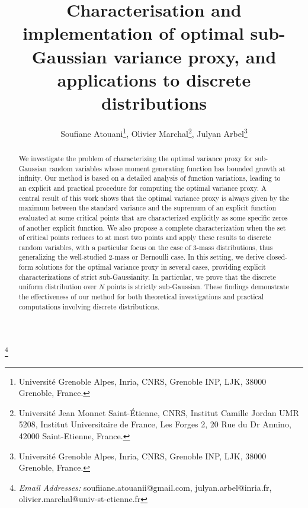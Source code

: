 \documentclass[a4paper, 10pt]{article}
\author{
Soufiane Atouani\footnote{Universit\'{e} Grenoble Alpes, Inria, CNRS, Grenoble INP, LJK, 38000 Grenoble, France.},
Olivier Marchal\footnote{Universit\'{e} Jean Monnet Saint-\'{E}tienne, CNRS, Institut Camille Jordan UMR 5208, Institut Universitaire de France, Les Forges 2, 20 Rue du Dr Annino, 42000 Saint-Etienne, France.}, 
Julyan Arbel\footnote{Universit\'{e} Grenoble Alpes, Inria, CNRS, Grenoble INP, LJK, 38000 Grenoble, France.}
}
\title{Characterisation and implementation of optimal sub-Gaussian variance proxy, and applications to discrete distributions}
\date{}
\renewcommand{\thefootnote}{\fnsymbol{footnote}}
\theoremstyle{definition}
\newcommand\blfootnote[1]{%
  \begingroup
  \renewcommand\thefootnote{}\footnote{#1}%
  \addtocounter{footnote}{-1}%
  \endgroup
}
\begin{document}
\maketitle

\blfootnote{\textit{Email Addresses:}
\textsf{soufiiane.atouanii@gmail.com},
\textsf{julyan.arbel@inria.fr},
\textsf{olivier.marchal@univ-st-etienne.fr}}

\begin{abstract}
We investigate the problem of characterizing the optimal variance proxy for sub-Gaussian random variables whose moment generating function has bounded growth at infinity. Our method is based on a detailed analysis of function variations, leading  to an explicit and practical procedure for computing the optimal variance proxy. A central result of this work shows that the optimal variance proxy is always given by the maximum between the standard variance and the supremum of an explicit function evaluated at some critical points that are characterized explicitly as some specific zeros of another explicit function. We also propose a complete characterization when the set of critical points reduces to at most two points and apply these results to discrete random variables, with a particular focus on the case of 3-mass distributions, thus generalizing the well-studied 2-mass or Bernoulli case. In this setting, we derive closed-form solutions for the optimal variance proxy in several cases, providing explicit characterizations of strict sub-Gaussianity. In particular, we prove that the discrete uniform distribution over $N$ points is strictly sub-Gaussian. These findings demonstrate the effectiveness of our method for both theoretical investigations and practical computations involving discrete distributions.
\end{abstract}


\end{document}

